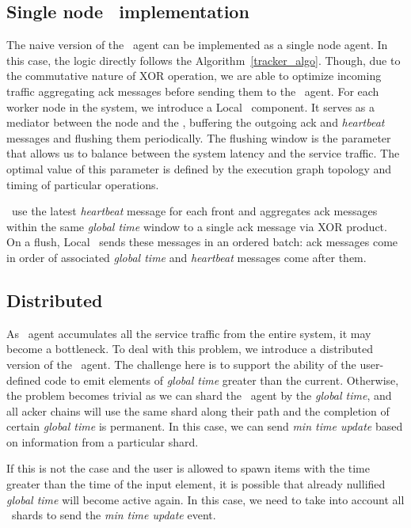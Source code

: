 
\subsection{Single node \tracker\ implementation}
The naive version of the \tracker\ agent can be implemented as a single node agent. In this case, the logic directly follows the Algorithm~\ref{tracker_algo}. Though, due to the commutative nature of XOR operation, we are able to optimize incoming traffic aggregating ack messages before sending them to the \tracker\ agent. For each worker node in the system, we introduce a Local \tracker\ component. It serves as a mediator between the node and the \tracker, buffering the outgoing ack and \textit{heartbeat} messages and flushing them periodically. The flushing window is the parameter that allows us to balance between the system latency and the service traffic. The optimal value of this parameter is defined by the execution graph topology and timing of particular operations.

\tracker\ use the latest \textit{heartbeat} message for each front and aggregates ack messages within the same \textit{global time} window to a single ack message via XOR product. On a flush, Local \tracker\ sends these messages in an ordered batch: ack messages come in order of associated \textit{global time} and \textit{heartbeat} messages come after them.

\subsection{Distributed \tracker}

As \tracker\ agent accumulates all the service traffic from the entire system, it may become a bottleneck. To deal with this problem, we introduce a distributed version of the \tracker\ agent. The challenge here is to support the ability of the user-defined code to emit elements of \textit{global time} greater than the current. Otherwise, the problem becomes trivial as we can shard the \tracker\ agent by the \textit{global time}, and all acker chains will use the same shard along their path and the completion of certain \textit{global time} is permanent. In this case, we can send \textit{min time update} based on information from a particular shard.

If this is not the case and the user is allowed to spawn items with the time greater than the time of the input element, it is possible that already nullified \textit{global time} will become active again. In this case, we need to take into account all \tracker\ shards to send the \textit{min time update} event.

